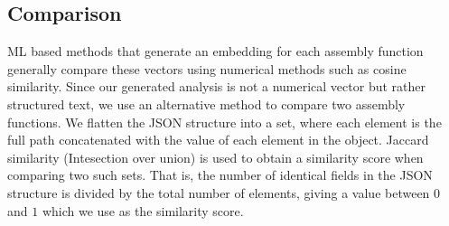 \subsection{Comparison}
{
    \renewcommand{\arraystretch}{1.1}
    \begin{table}[t]
    \centering
    \caption{Dataset details.}
    \end{table}
}

ML based methods that generate an embedding for each assembly function generally compare these vectors using numerical
methods such as cosine similarity.  Since our generated analysis is not a numerical vector but rather structured text,
we use an alternative method to compare two assembly functions. We flatten the JSON structure into a set, where each
element is the full path concatenated with the value of each element in the object. Jaccard similarity (Intesection over union)
is used to obtain a similarity score when comparing two such sets. That is, the number of identical fields in the JSON
structure is divided by the total number of elements, giving a value between \(0\) and \(1\) which we use as the similarity score.

